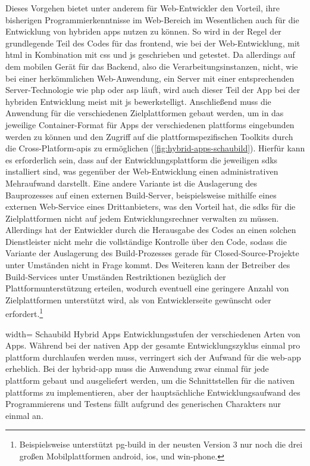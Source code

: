 Dieses Vorgehen bietet unter anderem für Web-Entwickler den Vorteil, ihre bisherigen Programmierkenntnisse im Web-Bereich im Wesentlichen auch für die Entwicklung von hybriden \glspl{app} nutzen zu können. 
So wird in der Regel der grundlegende Teil des Codes für das \gls{frontend}, wie bei der Web-Entwicklung, mit \gls{html} in Kombination mit \gls{css} und \gls{js} geschrieben und getestet. 
Da allerdings auf dem mobilen Gerät für das Backend, also die Verarbeitungsinstanzen, nicht, wie bei einer herkömmlichen Web-Anwendung, ein Server mit einer entsprechenden Server-Technologie wie \gls{php} oder \gls{asp} läuft, wird auch dieser Teil der App bei der hybriden Entwicklung meist mit \gls{js} bewerkstelligt. 
Anschließend muss die Anwendung für die verschiedenen Zielplattformen gebaut werden, um in das jeweilige Container-Format für Apps der verschiedenen \glspl{plattform} eingebunden werden zu können und den Zugriff auf die plattformspezifischen Toolkits durch die Cross-Platform-\glspl{api} zu ermöglichen (\autoref{fig:hybrid-apps-schaubild}).
Hierfür kann es erforderlich sein, dass auf der Entwicklungsplattform die jeweiligen \glspl{sdk} installiert sind, was gegenüber der Web-Entwicklung einen administrativen Mehraufwand darstellt.
Eine andere Variante ist die Auslagerung des Bauprozesses auf einen externen Build-Server, beispielsweise mithilfe eines externen Web-Service eines Drittanbieters, was den Vorteil hat, die \glspl{sdk} für die Zielplattformen nicht auf jedem Entwicklungsrechner verwalten zu müssen. 
Allerdings hat der Entwickler durch die Herausgabe des Codes an einen solchen Dienstleister nicht mehr die vollständige Kontrolle über den Code, sodass die Variante der Auslagerung des Build-Prozesses gerade für Closed-Source-Projekte unter Umständen nicht in Frage kommt. 
Des Weiteren kann der Betreiber des Build-Services unter Umständen Restriktionen bezüglich der Plattformunterstützung erteilen, wodurch eventuell eine geringere Anzahl von Zielplattformen unterstützt wird, als von Entwicklerseite gewünscht oder erfordert.\footnote{Beispielsweise unterstützt \gls{pg-build} in der neusten Version 3 nur noch die drei großen Mobilplattformen \gls{android}, \gls{ios}, und \gls{win-phone}.}

	{width=\fullimagesize}
	{Schaubild Hybrid Apps}
		{Entwicklungsstufen der verschiedenen Arten von Apps. Während bei der nativen App der gesamte Entwicklungszyklus einmal pro \gls{plattform} durchlaufen werden muss, verringert sich der Aufwand für die \gls{web-app} erheblich. Bei der \gls{hybrid-app} muss die Anwendung zwar einmal für jede \gls{plattform} gebaut und ausgeliefert werden, um die Schnittstellen für die nativen \glspl{plattform} zu implementieren, aber der hauptsächliche Entwicklungsaufwand des Programmierens und Testens fällt aufgrund des generischen Charakters nur einmal an.}
	{}

